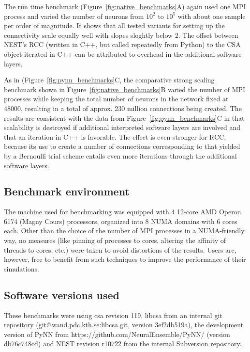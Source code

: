 \documentclass{frontiersSCNS} %
\newcommand{\Figure}[2]{Figure~\ref{#2}}
\newcommand{\Figure}[2]{Figure~#1}
\begin{document}
The run time benchmark (\Figure{5}{fig:native_benchmarks}A) again used
one MPI process and varied the number of neurons from $10^2$ to $10^5$
with about one sample per order of magnitude. It shows that all tested
variants for setting up the connectivity scale equally well with
slopes sloghtly below 2. The offset between NEST's RCC (written in
C++, but called repeatedly from Python) to the CSA object iterated in
C++ can be attributed to overhead in the additional software layers.

As in (\Figure{4}{fig:pynn_benchmarks}C, the comparative strong
scaling benchmark shown in \Figure{5}{fig:native_benchmarks}B varied
the number of MPI processes while keeping the total number of neurons
in the network fixed at $48000$, resulting in a total of approx. 230
million connections being created. The results are consistent with the
data from \Figure{4}{fig:pynn_benchmarks}C in that scalability is
destroyed if additional interpreted software layers are involved and
that an iteration in C++ is favorable. The effect is even stronger for
RCC, because its use to create a number of connections corresponding
to that yielded by a Bernoulli trial scheme entails even more
iterations through the additional software layers.

\subsection{Benchmark environment}

The machine used for benchmarking was equipped with 4 12-core AMD
Operon 6174 (Magny Cours) processors, organized into 8 NUMA domains
with 6 cores each. Other than the choice of the number of MPI
processes in a NUMA-friendly way, no measures (like pinning of
processes to cores, altering the affinity of threads to cores, etc.)
were taken to avoid distortions of the results. Users are, however,
free to benefit from such techniques to improve the performance of
their simulations.

\subsection{Software versions used}

These benchmarks were using csa revision 119, libcsa from an internal
git repository (git@wand.pdc.kth.se:libcsa.git, version 3ef2db519a),
the development version of PyNN from
https://github.com/NeuralEnsemble/PyNN/ (version db76c748cd) and NEST
revision r10722 from the internal Subversion repository.
\end{document}

